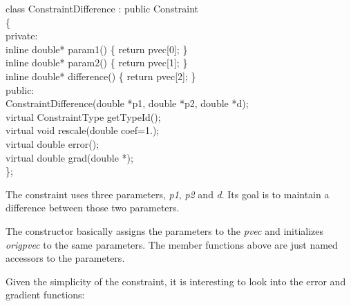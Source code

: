 \documentclass[12pt,twoside,a4paper]{book}
\begin{document}
    \begin{codequote}
    class ConstraintDifference : public Constraint\\
    \{\\
    private:\\
    \-\hspace{0.5cm}inline double* param1() \{ return pvec[0]; \}\\
    \-\hspace{0.5cm}inline double* param2() \{ return pvec[1]; \}\\
    \-\hspace{0.5cm}inline double* difference() \{ return pvec[2]; \}\\
    public:\\
    \-\hspace{0.5cm}ConstraintDifference(double *p1, double *p2, double *d);\\
    \-\hspace{0.5cm}virtual ConstraintType getTypeId();\\
    \-\hspace{0.5cm}virtual void rescale(double coef=1.);\\
    \-\hspace{0.5cm}virtual double error();\\
    \-\hspace{0.5cm}virtual double grad(double *);\\
    \};
    \end{codequote}

    The constraint uses three parameters, \emph{p1}, \emph{p2} and \emph{d}. Its goal is to maintain a difference between those two parameters.

    The constructor basically assigns the parameters to the \emph{pvec} and initializes \emph{origpvec} to the same parameters. The member functions above are just named accessors to the parameters.

    Given the simplicity of the constraint, it is interesting to look into the error and gradient functions:
\end{document}
